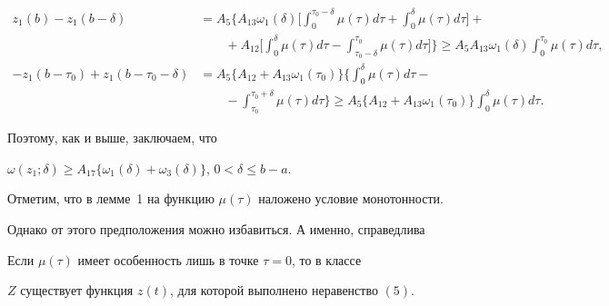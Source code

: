 \begin{pf}
\begin{align*}


z_1(b)-z_1(b-\delta)&=A_{5}\bigg\{ A_{13} \omega_1(\delta)\bigg[


\int_0^{\tau_0-\delta}\mu(\tau) d\tau +\int_0^{\delta}


\mu(\tau) d\tau \bigg] + \\


%


&\qquad +A_{12} \bigg[ \int_0^{\delta}\mu(\tau) d\tau -


\int_{\tau_0-\delta}^{\tau_0}\mu(\tau) d\tau \bigg] \bigg\}\geq


A_5 A_{13} \omega_1(\delta)\int_0^{\tau_0}\mu(\tau)d\tau,\\


%


-z_1(b-\tau_0)+z_1(b-\tau_0-\delta)&=A_5\big\{ A_{12}+A_{13}


\omega_1(\tau_0)\big\} \bigg\{\int_0^{\delta}\mu(\tau)d\tau -\\


%


&\qquad-\int_{\tau_0}^{\tau_0+\delta} \mu(\tau) d\tau \bigg\}


\geq A_5 \big\{ A_{12}+A_{13}


\omega_1(\tau_0)\big\}\int_0^{\delta}


\mu(\tau) d\tau .


\end{align*}


Поэтому, как и выше, заключаем, что


$\omega(z_1;\delta)\geq A_{17} \bigl\{ \omega_1(\delta)+


\omega_3(\delta)\bigr\}$, $0<\delta\leq b-a$.


\end{pf}





Отметим, что в лемме~1 на функцию $\mu(\tau)$ наложено условие монотонности.


Однако от этого предположения можно избавиться. А именно, справедлива





\begin{lem}


Если $\mu(\tau)$ имеет особенность лишь в точке $\tau =0$, то в классе


$Z$ существует функция $z(t)$, для которой выполнено неравенство $(5)$.


\end{lem}





